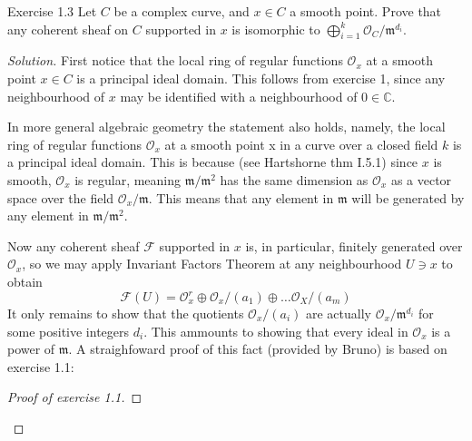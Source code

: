 \begin{idea5}{Exercise 1.3}\leavevmode
	Let $C$ be a  complex curve, and $x\in C$ a smooth point. Prove that any coherent sheaf on $C$ supported in $x$ is isomorphic to $\bigoplus_{i=1}^k \mathcal{O}_C/\mathfrak{m}^{d_i} $.
\end{idea5}

\begin{proof}[Solution]\leavevmode
	First notice that the local ring of regular functions $\mathcal{O}_x$ at a smooth point $x\in C$ is a principal ideal domain. This follows from exercise 1, since any neighbourhood of $x$ may be identified with a neighbourhood of $0\in\mathbb{C}$.

	\begin{remark}
		In more general algebraic geometry the statement also holds, namely, the local ring of regular functions $\mathcal{O}_x$ at a smooth point x in a curve over a closed field $k$ is a principal ideal domain. This is because (see Hartshorne thm  I.5.1) since $x$ is smooth, $\mathcal{O}_x$ is regular, meaning $\mathfrak{m}/\mathfrak{m}^2$ has the same dimension as $\mathcal{O}_x$ as a vector space over the field $\mathcal{O}_x/\mathfrak{m}$. This means that any element in $\mathfrak{m}$ will be generated by any element in $\mathfrak{m}/\mathfrak{m}^2$. 
	\end{remark}

	Now any coherent sheaf $\mathcal{F}$ supported in $x$ is, in particular, finitely generated over $\mathcal{O}_x$, so we may apply Invariant Factors Theorem at any neighbourhood $U  \ni x$ to obtain
	\[\mathcal{F}(U)=\mathcal{O}_x^r\oplus \mathcal{O}_x/(a_1)\oplus \ldots \mathcal{O}_X/(a_m)\]
	It only remains to show that the quotients $\mathcal{O}_x/(a_i)$ are actually $\mathcal{O}_x/\mathfrak{m}^{d_i}$ for some positive integers $d_{i}$. This ammounts to showing that every ideal in $\mathcal{O}_x$ is a power of $\mathfrak{m}$. A straighfoward proof of this fact (provided by Bruno) is based on exercise 1.1: 

	\begin{proof}[Proof of exercise 1.1]
	

\end{proof}
\end{proof}
